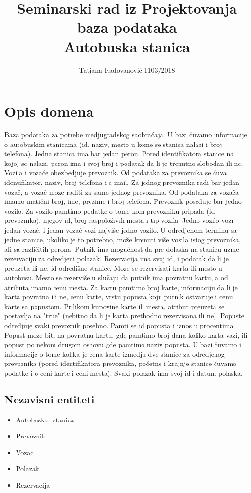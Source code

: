 \documentclass[12pt]{article}
\title{Seminarski rad iz Projektovanja baza podataka \\ Autobuska stanica}
\author{Tatjana Radovanovi\'c 1103/2018}
\begin{document}
\maketitle 

\newpage

\section{Opis domena}
Baza podataka za potrebe medjugradskog saobra\'caja. U bazi \v cuvamo informacije o autobuskim stanicama (id, naziv, mesto u kome se stanica nalazi i broj telefona). Jedna stanica ima bar jedan peron. Pored identifikatora stanice na kojoj se nalazi, peron ima i svoj broj i podatak da li je trenutno slobodan ili ne. Vozila i voza\v ce obezbedjuje prevoznik. Od podataka za prevoznika se \v cuva identifikator, naziv, broj telefona i e-mail. Za jednog prevoznika radi bar jedan voza\v c, a voza\v c moze raditi za samo jednog prevoznika. Od podataka za voza\v ca imamo mati\v cni broj, ime, prezime i broj telefona. Prevoznik poseduje bar jedno vozilo. Za vozilo pamtimo podatke o tome kom prevozniku pripada (id prevoznika), njegov id, broj raspolo\v zivih mesta i tip vozila. Jedno vozilo vozi jedan voza\v c, i jedan voza\v c vozi najvi\v se jedno vozilo. U odredjenom terminu sa jedne stanice, ukoliko je to potrebno, mo\v ze krenuti vi\v se vozila istog prevoznika, ali sa razli\v citih perona. Putnik ima mogu\'cnost da pre dolaska na stanicu uzme rezervaciju za odredjeni polazak. Rezervacija ima svoj id, i podatak da li je preuzeta ili ne, id odredi\v sne stanice. Moze se rezervisati karta ili mesto u autobusu. Mesto se rezervi\v se u slu\v caju da putnik ima povratnu kartu, a od atributa imamo cenu mesta. Za kartu pamtimo broj karte, informaciju da li je karta povratna ili ne, cenu karte, vrstu popusta koju putnik ostvaruje i cenu karte sa popustom. Prilikom kupovine karte ili mesta, atribut preuzeta se postavlja na "true" (nebitno da li je karta prethodno rezervisana ili ne). Popuste odredjuje svaki prevoznik posebno. Pamti se id popusta i iznos u procentima. Popust moze biti na povratnu kartu, gde pamtimo broj dana koliko karta vazi, ili popust po nekom drugom osnovu gde pamtimo naziv popusta. U bazi \v cuvamo i informacije o tome kolika je cena karte izmedju dve stanice za odredjenog prevoznika (pored identifikatora prevoznika, po\v cetne i krajnje stanice \v cuvamo podatke i o ceni karte i ceni mesta). 
Svaki polazak ima svoj id i datum polaska.

\subsection{Nezavisni entiteti}
\begin{itemize}
	\item Autobuska\_stanica
	\item Prevoznik
	\item Vozac
	\item Polazak
	\item Rezervacija
\end{itemize}
\end{document}
